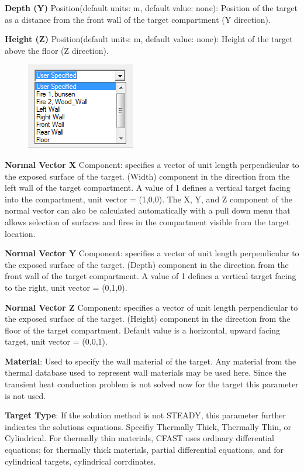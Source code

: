 \textbf{Depth (Y)} Position(default units: m, default value: none): Position of the target as a distance from the front wall of the target compartment (Y direction).

\textbf{Height (Z)} Position(default units: m, default value: none): Height of the target above the floor (Z direction).

\begin{figure}
  \includegraphics[width=1.875in]{FIGURES/Input_File/Target_Points_To}
\end{figure}

\textbf{Normal Vector X} Component: specifies a vector of unit length perpendicular to the exposed surface of the target. (Width) component in the direction from the left wall of the target compartment. A value of 1 defines a vertical target facing into the compartment, unit vector = (1,0,0). The X, Y, and Z component of the normal vector can also be calculated automatically with a pull down menu that allows selection of surfaces and fires in the compartment visible from the target location.

\textbf{Normal Vector Y} Component: specifies a vector of unit length perpendicular to the exposed surface of the target. (Depth) component in the direction from the front wall of the target compartment. A value of 1 defines a vertical target facing to the right, unit vector = (0,1,0).

\textbf{Normal Vector Z} Component: specifies a vector of unit length perpendicular to the exposed surface of the target. (Height) component in the direction from the floor of the target compartment. Default value is a horizontal, upward facing target, unit vector = (0,0,1).

\textbf{Material}: Used to specify the wall material of the target.  Any material from the thermal database used to represent wall materials may be used here.  Since the transient heat conduction problem is not solved now for the target this parameter is not used.

\textbf{Target Type}: If the solution method is not STEADY, this parameter further indicates the solutions equations.  Specifiy Thermally Thick, Thermally Thin, or Cylindrical.  For thermally thin materials, CFAST uses ordinary differential equations; for thermally thick materials, partial differential equations, and for cylindrical targets, cylindrical corrdinates.

